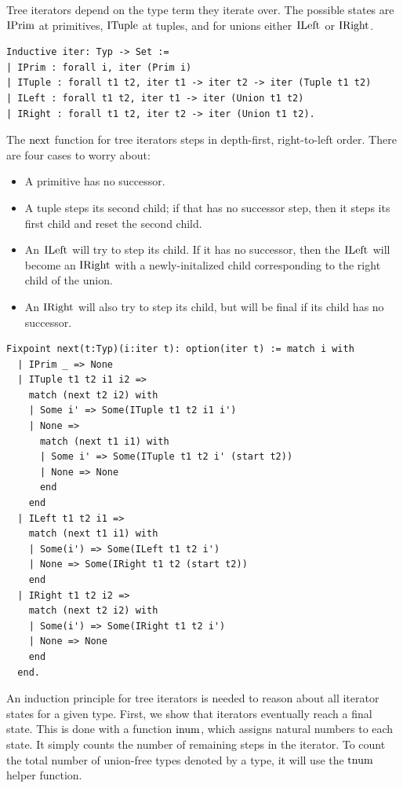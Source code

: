 \documentclass[a4paper,english]{lipics-v2019}
\renewcommand{\c}[1]{\ensuremath{\text{\lstinline{#1}}}\xspace}
\begin{document}
Tree iterators depend on the type term they iterate over. The possible
states are \c{IPrim} at primitives, \c{ITuple} at tuples, and for unions
either \c{ILeft} or \c{IRight}.

\begin{lstlisting}
Inductive iter: Typ -> Set :=
| IPrim : forall i, iter (Prim i)
| ITuple : forall t1 t2, iter t1 -> iter t2 -> iter (Tuple t1 t2)
| ILeft : forall t1 t2, iter t1 -> iter (Union t1 t2)
| IRight : forall t1 t2, iter t2 -> iter (Union t1 t2).
\end{lstlisting}

\noindent
The \c{next} function for tree iterators steps in depth-first,
right-to-left order. There are four cases to worry about:
\begin{itemize}
  \item A primitive has no successor.
  \item A tuple steps its second child; if that
has no successor step, then it steps its first child and reset the second
child.
  \item An \c{ILeft} will try to step its child. If it has no successor, then the \c{ILeft} will become an \c{IRight} with a newly-initalized child corresponding to the right child of the union.
  \item An \c{IRight} will also try to step its child, but will be final if its child has no successor.
  \end{itemize}

\begin{lstlisting}
Fixpoint next(t:Typ)(i:iter t): option(iter t) := match i with
  | IPrim _ => None
  | ITuple t1 t2 i1 i2 =>
    match (next t2 i2) with
    | Some i' => Some(ITuple t1 t2 i1 i')
    | None =>
      match (next t1 i1) with
      | Some i' => Some(ITuple t1 t2 i' (start t2))
      | None => None
      end
    end
  | ILeft t1 t2 i1 =>
    match (next t1 i1) with
    | Some(i') => Some(ILeft t1 t2 i')
    | None => Some(IRight t1 t2 (start t2))
    end
  | IRight t1 t2 i2 => 
    match (next t2 i2) with
    | Some(i') => Some(IRight t1 t2 i')
    | None => None
    end
  end.
\end{lstlisting}

\noindent
An induction principle for tree iterators is needed to reason about all
iterator states for a given type. First, we show that iterators eventually
reach a final state. This is done with a function \c{inum}, which assigns
natural numbers to each state. It simply counts the number of remaining
steps in the iterator. To count the total number of union-free types 
denoted by a type, it will use the \c{tnum} helper function.
\end{document}
